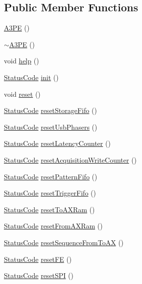 \subsection*{Public Member Functions}
\begin{DoxyCompactItemize}
\item 
\hyperlink{classA3PE_ae3e49a43c661f5e9c1b0edaee14fc297}{A3PE} ()
\item 
\hyperlink{classA3PE_aab155e065b455ff439daf47a976399c3}{$\sim$A3PE} ()
\item 
void \hyperlink{classA3PE_ae495a413cc26d31321b31942ebef1bfa}{help} ()
\item 
\hyperlink{classStatusCode}{StatusCode} \hyperlink{classA3PE_abe07bae8ce2f32926b7258f269ae655e}{init} ()
\item 
void \hyperlink{classA3PE_a449775588222d544aeeaab190d553652}{reset} ()
\item 
\hyperlink{classStatusCode}{StatusCode} \hyperlink{classA3PE_a8e7074703227b118aa9230258f22b44c}{resetStorageFifo} ()
\item 
\hyperlink{classStatusCode}{StatusCode} \hyperlink{classA3PE_a0ad1110ea755ffd0b277284d807a8794}{resetUsbPhasers} ()
\item 
\hyperlink{classStatusCode}{StatusCode} \hyperlink{classA3PE_a44c50d822ac4f5d8f2b8ed75c5b90580}{resetLatencyCounter} ()
\item 
\hyperlink{classStatusCode}{StatusCode} \hyperlink{classA3PE_a557ea9cfa97a03db1514af2fe8936df3}{resetAcquisitionWriteCounter} ()
\item 
\hyperlink{classStatusCode}{StatusCode} \hyperlink{classA3PE_a4e5b677dd2872428abf3d64ef7a769c1}{resetPatternFifo} ()
\item 
\hyperlink{classStatusCode}{StatusCode} \hyperlink{classA3PE_ac81388bd2988192cf54034b245f69891}{resetTriggerFifo} ()
\item 
\hyperlink{classStatusCode}{StatusCode} \hyperlink{classA3PE_a31f72fac5a0f00bcf3a0db99bd5704ee}{resetToAXRam} ()
\item 
\hyperlink{classStatusCode}{StatusCode} \hyperlink{classA3PE_aa10639563d06c0d09f3c0725710ff35d}{resetFromAXRam} ()
\item 
\hyperlink{classStatusCode}{StatusCode} \hyperlink{classA3PE_a6015ba83a7b828efb1969291ab740eee}{resetSequenceFromToAX} ()
\item 
\hyperlink{classStatusCode}{StatusCode} \hyperlink{classA3PE_a2cfdb2f37d3d786cbe1ff42fef37b276}{resetFE} ()
\item 
\hyperlink{classStatusCode}{StatusCode} \hyperlink{classA3PE_ae164123b49f8c4d1d119dbf201f0a839}{resetSPI} ()

\end{DoxyCompactItemize}
